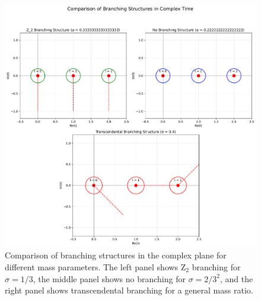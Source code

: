 \begin{figure}[htbp]
  \centering
  \includegraphics[width=\textwidth]{branching_comparison.pdf}
  \caption{Comparison of branching structures in the complex plane for different mass parameters. The left panel shows Z$_2$ branching for $\sigma = 1/3$, the middle panel shows no branching for $\sigma = 2/3^2$, and the right panel shows transcendental branching for a general mass ratio.}
  \label{fig:branching_comparison}
\end{figure}

